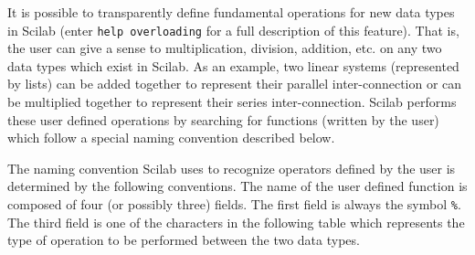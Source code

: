         It is possible to transparently define fundamental operations 
for new data types in Scilab (enter {\tt help overloading} for 
a full description of this feature).
That is, the user can give a sense to multiplication, division, addition, etc.
on any two data types which exist in Scilab.  As an example, two linear
systems (represented by lists)
can be added together to represent their parallel inter-connection
or can be multiplied together to represent their series inter-connection.
Scilab performs these user defined operations by searching for functions
(written by the user) which follow a special naming convention described
below.

        The naming convention Scilab uses to recognize operators 
defined by the user is determined by the following conventions.  The name
of the user defined function is composed of four (or possibly three)
fields.  The first field is always the symbol {\tt \%}.  
The third field is one of the characters in the following table
which represents the type of operation to be performed between the
two data types.

